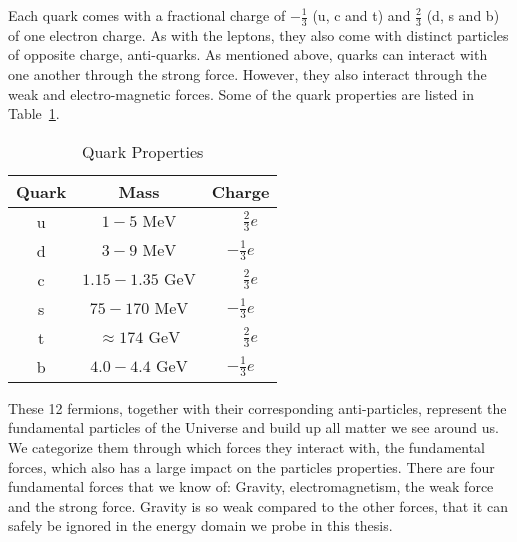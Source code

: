 Each quark comes with a fractional charge of $-\frac{1}{3}$ (u, c and t) and $\frac{2}{3}$ (d, s and b) of one electron charge. As with the leptons, they also come with distinct particles of opposite charge, anti-quarks. As mentioned above, quarks can interact with one another through the strong force. However, they also interact through the weak and electro-magnetic forces.
Some of the quark properties are listed in Table~\ref{table:theory:quarkprop}.
\begin{table}
\begin{center}
\begin{tabular}{|c|c|c|}%
\hline
Quark & Mass & Charge \\%
\hline
u & $1-5 \mbox{ MeV}$         & $\phantom{-}\frac{2}{3} e$  \\%
d & $3-9 \mbox{ MeV}$         & $-\frac{1}{3} e$            \\%
c & $1.15-1.35 \mbox{ GeV}$   & $\phantom{-}\frac{2}{3} e$  \\%
s & $75-170 \mbox{ MeV}$      & $-\frac{1}{3}e$             \\%
t & $\approx 174 \mbox{ GeV}$ & $\phantom{-}\frac{2}{3} e$  \\%
b & $4.0-4.4 \mbox{ GeV}$     & $-\frac{1}{3} e$            \\%
\hline
\end{tabular}
\end{center}
\caption{Quark Properties}
\label{table:theory:quarkprop}
\end{table}
These 12 fermions, together with their corresponding anti-particles, represent the fundamental particles of the Universe and build up all matter we see around us. We categorize them through which forces they interact with, the fundamental forces, which also has a large impact on the particles properties.
There are four fundamental forces that we know of: Gravity, electromagnetism, the weak force and the strong force. Gravity is so weak compared to the other forces, that it can safely be ignored in the energy domain we probe in this thesis. 
